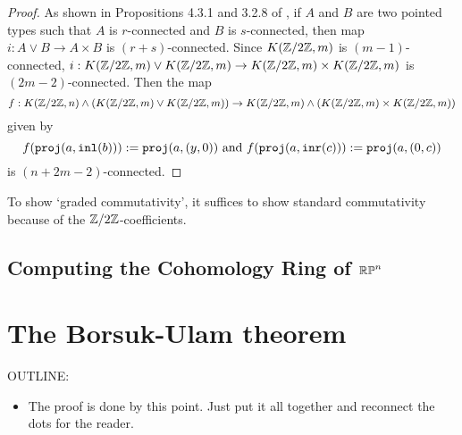 \documentclass{amsart}
\begin{document}
\begin{proof}
	As shown in Propositions 4.3.1 and 3.2.8 of \cite{brunerie:thesis}, if $A$ and $B$ are two pointed types such that $A$ is $r$-connected and $B$ is $s$-connected, then map $i:A\vee B\to A\times B$ is $(r+s)$-connected. Since $K(\mathbb{Z}/2\mathbb{Z},m)$ is $(m-1)$-connected, $i:K(\mathbb{Z}/2\mathbb{Z},m)\vee K(\mathbb{Z}/2\mathbb{Z},m)\to K(\mathbb{Z}/2\mathbb{Z},m)\times K(\mathbb{Z}/2\mathbb{Z},m)$ is $(2m-2)$-connected. Then the map 
	\[f:K(\mathbb{Z}/2\mathbb{Z},n)\wedge\left(K(\mathbb{Z}/2\mathbb{Z},m)\vee K(\mathbb{Z}/2\mathbb{Z},m)\right)\to K(\mathbb{Z}/2\mathbb{Z},m)\wedge\left(K(\mathbb{Z}/2\mathbb{Z},m)\times K(\mathbb{Z}/2\mathbb{Z},m)\right)\]
	given by 
	\[f(\mathtt{proj}(a,\mathtt{inl}(b))):=\mathtt{proj}(a,(y,0))\text{~and~} f(\mathtt{proj}(a,\mathtt{inr}(c))):=\mathtt{proj}(a,(0,c))\]
	is $(n+2m-2)$-connected. 
	
	

	
	\end{proof}



 To show
`graded commutativity', it suffices to show standard
commutativity because of the $ \mathbb{Z}/2\mathbb{Z} $-coefficients.  




\subsection{Computing the Cohomology Ring of $\mathbb{RP}^n$}




\section{The Borsuk-Ulam theorem}
\label{sec:borsuk-ulam}

OUTLINE:
\begin{itemize}
\item
  The proof is done by this point. Just put it all
  together and reconnect the dots for the reader.
\end{itemize}



\nocite{shul:bfp,brunerie:thesis,br:rp-hott}

\end{document}
